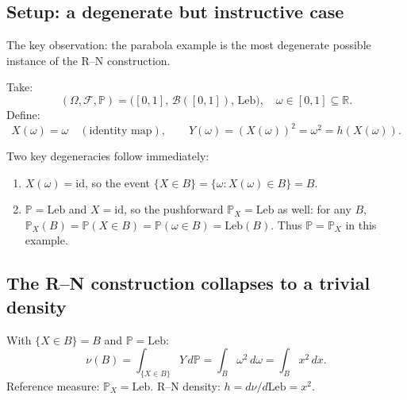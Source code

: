\documentclass[12pt, a4paper]{article}
\theoremstyle{definition}
\newcommand{\R}{\mathbb{R}}
\newcommand{\Prob}{\mathbb{P}}
\newcommand{\borel}{\mathcal{B}}
\newcommand{\sF}{\mathcal{F}}
\newcommand{\Leb}{\mathrm{Leb}}
\begin{document}
\subsection{Setup: a degenerate but instructive case }

The key observation: the parabola example is the most degenerate
possible instance of the R--N construction.

Take:
\[
  (\Omega,\sF,\Prob) = \bigl([0,1],\,\borel([0,1]),\,\Leb\bigr),
  \quad \omega\in[0,1]\subseteq\R.
\]
Define:
\[
  X(\omega) = \omega \quad (\text{identity map}),
  \qquad
  Y(\omega) = (X(\omega))^2 = \omega^2 = h(X(\omega)).
\]

Two key degeneracies follow immediately:

\begin{enumerate}[label=(\arabic*)]
  \item $X(\omega)=\mathrm{id}$, so the event
    $\{X\in B\}=\{\omega:X(\omega)\in B\}=B$.

  \item $\Prob=\Leb$ and $X=\mathrm{id}$, so the pushforward
    $\Prob_X=\Leb$ as well: for any $B$,
    $\Prob_X(B)=\Prob(X\in B)=\Prob(\omega\in B)=\Leb(B)$.
    Thus $\Prob=\Prob_X$ in this example.
\end{enumerate}

\begin{center}
\end{center}

\subsection{The R--N construction collapses to a trivial density}

With $\{X\in B\}=B$ and $\Prob=\Leb$:
\[
  \nu(B) = \int_{\{X\in B\}} Y\,d\Prob
         = \int_B \omega^2\,d\omega
         = \int_B x^2\,dx.
\]
Reference measure: $\Prob_X=\Leb$.
R--N density: $h = d\nu/d\Leb = x^2$.
\end{document}
